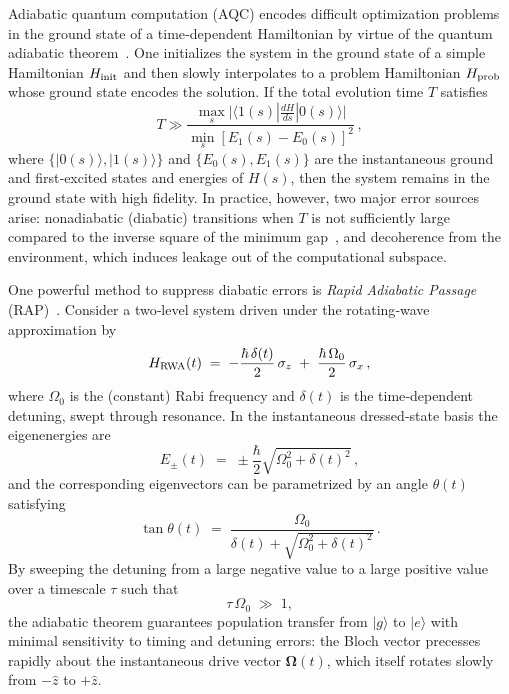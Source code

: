 \documentclass[reprint, amsmath,amssymb,nofootinbib, aps,superscriptaddress,longbibliography]{revtex4-1}
\begin{document}
Adiabatic quantum computation (AQC) encodes difficult optimization problems in the ground state of a time‐dependent Hamiltonian by virtue of the quantum adiabatic theorem~\cite{jordan2006error}.  One initializes the system in the ground state of a simple Hamiltonian \(H_{\rm init}\) and then slowly interpolates to a problem Hamiltonian \(H_{\rm prob}\) whose ground state encodes the solution.  If the total evolution time \(T\) satisfies
\begin{equation}
T \gg \frac{\max_{s} \big|\langle 1(s)|\tfrac{dH}{ds}|0(s)\rangle\big|}{\min_{s} [E_1(s)-E_0(s)]^2}\,,
\end{equation}
where \(\{|0(s)\rangle,|1(s)\rangle\}\) and \(\{E_0(s),E_1(s)\}\) are the instantaneous ground and first‐excited states and energies of \(H(s)\), then the system remains in the ground state with high fidelity.  In practice, however, two major error sources arise:  
nonadiabatic (diabatic) transitions when \(T\) is not sufficiently large compared to the inverse square of the minimum gap~\cite{childs2001robustness}, and decoherence from the environment, which induces leakage out of the computational subspace.

One powerful method to suppress diabatic errors is \emph{Rapid Adiabatic Passage} (RAP)~\cite{chen2010shortcuts}.  Consider a two‐level system driven under the rotating‐wave approximation by
\begin{equation}
H_{\rm RWA}(t) \;=\; -\frac{\hbar\,\delta(t)}{2}\,\sigma_{z}\;+\;\frac{\hbar\,\Omega_{0}}{2}\,\sigma_{x}\,,
\end{equation}
where \(\Omega_{0}\) is the (constant) Rabi frequency and \(\delta(t)\) is the time‐dependent detuning, swept through resonance.  In the instantaneous dressed‐state basis the eigenenergies are
\begin{equation}
E_{\pm}(t) \;=\; \pm \frac{\hbar}{2}\sqrt{\Omega_{0}^{2} + \delta(t)^{2}}\,,
\end{equation}
and the corresponding eigenvectors can be parametrized by an angle \(\theta(t)\) satisfying
\begin{equation}
\tan\theta(t) \;=\; \frac{\Omega_{0}}{\delta(t) + \sqrt{\Omega_{0}^{2} + \delta(t)^{2}}}\,.
\end{equation}
By sweeping the detuning from a large negative value to a large positive value over a timescale \(\tau\) such that
\begin{equation}
\tau\,\Omega_{0}\;\gg\;1,
\end{equation}
the adiabatic theorem guarantees population transfer from \(\lvert g\rangle\) to \(\lvert e\rangle\) with minimal sensitivity to timing and detuning errors: the Bloch vector precesses rapidly about the instantaneous drive vector \(\boldsymbol{\Omega}(t)\), which itself rotates slowly from \(-\hat z\) to \(+\hat z\).  
\end{document}
